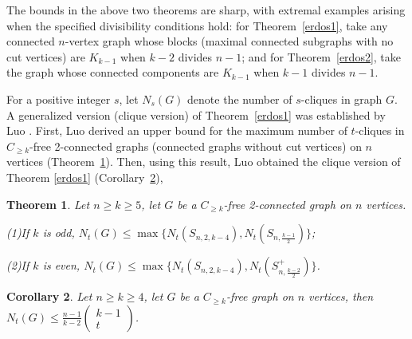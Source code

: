 \documentclass[preprint,12pt]{elsarticle}
\newtheorem{thm}{Theorem}[section]
\newtheorem{cor}[thm]{Corollary}
\begin{document}
        The bounds in the above two theorems are sharp, with extremal examples arising when the specified divisibility conditions hold: for Theorem~\ref{erdos1}, take any connected $n$-vertex graph whose blocks (maximal connected subgraphs with no cut vertices) are $K_{k-1} $  when $k-2$ divides $n-1$; and for Theorem~\ref{erdos2}, take the graph whose connected components are  $K_{k-1} $ when $k-1$ divides $n-1$.

        For a positive integer $s$, let $N_s(G)$ denote the number of $s$-cliques in graph $G$. A generalized version (clique version) of Theorem~\ref{erdos1} was established by Luo \cite{Luo2018}. First, Luo derived an upper bound for the maximum number of $t$-cliques in $C_{\geq k}$-free 2-connected graphs (connected graphs without cut vertices) on $n$ vertices (Theorem~\ref{CT2-2}). Then, using this result, Luo obtained the clique version of Theorem \ref{erdos1} (Corollary~\ref{CT2-3}),
        \begin{thm}\label{CT2-2}\cite{Luo2018}
            Let $n \geq k \geq 5$, let $G$ be a $C_{\geq{k}}$-free 2-connected graph on $n$ vertices.

            \noindent (1)If $k$ is odd, $N_t(G) \leq \max\{N_t(S_{n,2,k-4}), N_t(S_{n, \frac{k-1}{2} })\}$;

            \noindent (2)If $k$ is even, $N_t(G) \leq \max\{N_t(S_{n,2,k-4}), N_t(S_{n, \frac{k-2}{2} }^+)\}$.

		\end{thm}
        \begin{cor}\label{CT2-3}\cite{Luo2018}
            Let $n \geq k \geq 4$, let $G$ be a $C_{\geq{k}}$-free graph on $n$ vertices, then
            $N_t(G) \leq \frac{n-1}{k-2}\begin{pmatrix}k-1\\t\end{pmatrix}$.
		\end{cor}
\end{document}
